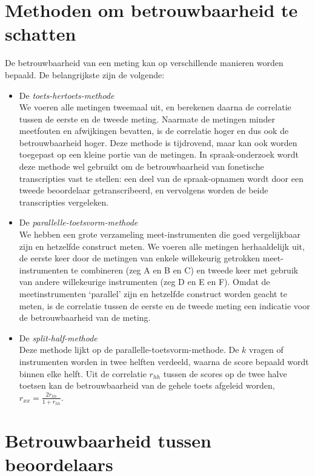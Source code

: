 \documentclass[
]{book}
\begin{document}
\hypertarget{methoden-om-betrouwbaarheid-te-schatten}{%
\section{Methoden om betrouwbaarheid te schatten}\label{methoden-om-betrouwbaarheid-te-schatten}}

De betrouwbaarheid van een meting kan op verschillende manieren worden
bepaald. De belangrijkste zijn de volgende:

\begin{itemize}
\item
  De \emph{toets-hertoets-methode}\\
  We voeren alle metingen tweemaal uit, en berekenen daarna de
  correlatie tussen de eerste en de tweede meting. Naarmate de
  metingen minder meetfouten en afwijkingen bevatten, is de correlatie
  hoger en dus ook de betrouwbaarheid hoger. Deze methode is
  tijdrovend, maar kan ook worden toegepast op een kleine portie van
  de metingen. In spraak-onderzoek wordt deze methode wel gebruikt om
  de betrouwbaarheid van fonetische transcripties vast te stellen: een
  deel van de spraak-opnamen wordt door een tweede beoordelaar
  getranscribeerd, en vervolgens worden de beide transcripties
  vergeleken.
\item
  De \emph{parallelle-toetsvorm-methode}\\
  We hebben een grote verzameling meet-instrumenten die goed
  vergelijkbaar zijn en hetzelfde construct meten. We voeren alle
  metingen herhaaldelijk uit, de eerste keer door de metingen van
  enkele willekeurig getrokken meet-instrumenten te combineren (zeg A
  en B en C) en tweede keer met gebruik van andere willekeurige
  instrumenten (zeg D en E en F). Omdat de meetinstrumenten `parallel'
  zijn en hetzelfde construct worden geacht te meten, is de correlatie
  tussen de eerste en de tweede meting een indicatie voor de
  betrouwbaarheid van de meting.
\item
  De \emph{split-half-methode}\\
  Deze methode lijkt op de parallelle-toetsvorm-methode. De \(k\) vragen
  of instrumenten worden in twee helften verdeeld, waarna de score
  bepaald wordt binnen elke helft. Uit de correlatie \(r_{hh}\) tussen
  de scores op de twee halve toetsen kan de betrouwbaarheid van de
  gehele toets afgeleid worden, \(r_{xx} = \frac{2r_{hh}}{1+r_{hh}}\).
\end{itemize}

\hypertarget{betrouwbaarheid-tussen-beoordelaars}{%
\section{Betrouwbaarheid tussen beoordelaars}\label{betrouwbaarheid-tussen-beoordelaars}}
\end{document}
